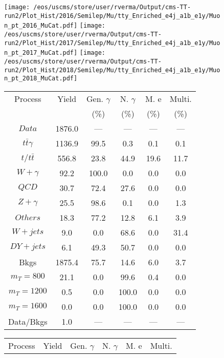 \begin{figure}
\centering
\texttt{[image: /eos/uscms/store/user/rverma/Output/cms-TT-run2/Plot\_Hist/2016/Semilep/Mu/tty\_Enriched\_e4j\_a1b\_e1y/Muon\_pt\_2016\_MuCat.pdf]}
\texttt{[image: /eos/uscms/store/user/rverma/Output/cms-TT-run2/Plot\_Hist/2017/Semilep/Mu/tty\_Enriched\_e4j\_a1b\_e1y/Muon\_pt\_2017\_MuCat.pdf]}
\texttt{[image: /eos/uscms/store/user/rverma/Output/cms-TT-run2/Plot\_Hist/2018/Semilep/Mu/tty\_Enriched\_e4j\_a1b\_e1y/Muon\_pt\_2018\_MuCat.pdf]}
\begin{minipage}[c]{0.32\textwidth}
\centering
\tiny{
\begin{tabular}{cccccc}
\hline
Process & Yield & Gen. $\gamma$ & N. $\gamma$ & M. e & Multi. \\
 &  & (\%) & (\%) & (\%) & (\%)  \\
\hline
                                                                      $ Data $ &  1876.0 &  --- &  --- &  --- &  ---\\
$ t\bar{t}\gamma $ &  1136.9 &  99.5 &  0.3 &  0.1 &  0.1\\
$ t/t\bar{t} $ &  556.8 &  23.8 &  44.9 &  19.6 &  11.7\\
$ W+\gamma $ &  92.2 &  100.0 &  0.0 &  0.0 &  0.0\\
$ QCD $ &  30.7 &  72.4 &  27.6 &  0.0 &  0.0\\
$ Z+\gamma $ &  25.5 &  98.6 &  0.1 &  0.0 &  1.3\\
$ Others $ &  18.3 &  77.2 &  12.8 &  6.1 &  3.9\\
$ W+jets $ &  9.0 &  0.0 &  68.6 &  0.0 &  31.4\\
$ DY+jets $ &  6.1 &  49.3 &  50.7 &  0.0 &  0.0\\
Bkgs &  1875.4 &  75.7 &  14.6 &  6.0 &  3.7\\
$ m_{T} = 800 $ &  21.1 &  0.0 &  99.6 &  0.4 &  0.0\\
$ m_{T} = 1200 $ &  0.5 &  0.0 &  100.0 &  0.0 &  0.0\\
$ m_{T} = 1600 $ &  0.0 &  0.0 &  100.0 &  0.0 &  0.0\\
Data/Bkgs &  1.0 &  --- &  --- &  --- &  ---\\
\hline
\end{tabular}
}
\end{minipage}
\begin{minipage}[c]{0.32\textwidth}
\centering
\tiny{
\begin{tabular}{cccccc}
\hline
Process & Yield & Gen. $\gamma$ & N. $\gamma$ & M. e & Multi. \\

\end{tabular}}
\end{minipage}
\end{figure}
